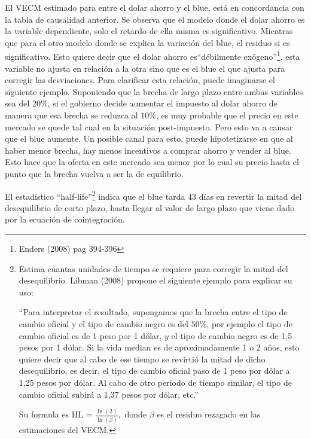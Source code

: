 \documentclass[11pt,a4paper]{article}
\begin{document}
El VECM estimado para entre el dolar ahorro y el blue, está en concordancia con la tabla de causalidad anterior. Se observa que el modelo donde el dolar ahorro es la variable dependiente, solo el retardo de ella misma es significativo. Mientras que para el otro modelo donde se explica la variación del blue, el residuo si es significativo. Esto quiere decir que el dolar ahorro es``débilmente exógeno''\footnote{Enders (2008) pag 394-396}, esta variable no ajusta en relación a la otra sino que es el blue el que ajusta para corregir las desviaciones. Para clarificar esta relación, puede imaginarse el siguiente ejemplo. Suponiendo que la brecha de largo plazo entre ambas variables sea del $20 \% $, si el gobierno decide aumentar el impuesto al dolar ahorro de manera que esa brecha se reduzca al $10 \% $, es muy probable que el precio en este mercado se quede tal cual en la situación post-impuesto. Pero esto va a causar que el blue aumente. Un posible canal para esto, puede hipotetizarse en que al haber menor brecha, hay menos incentivos a comprar ahorro y vender al blue. Esto hace que la oferta en este mercado sea menor por lo cual su precio hasta el punto que la brecha vuelva a ser la de equilibrio. 

El estadístico ``half-life''\footnote{Estima cuantas unidades de tiempo se requiere para corregir la mitad del desequilibrio. Libman (2008) propone el siguiente ejemplo para explicar su uso: 
\begin{center}
``Para interpretar el resultado, supongamos que la brecha entre el tipo de cambio oficial y el tipo de cambio negro es del $50 \%$, por ejemplo el tipo de cambio oficial es de 1 peso por 1 dólar, $y$ el tipo de cambio negro es de 1,5 pesos por 1 dólar. Si la vida median es de aproximadamente 1 o 2 años, esto quiere decir que al cabo de ese tiempo se revirtió la mitad de dicho desequilibrio, es decir, el tipo de cambio oficial paso de 1 peso por dólar a 1,25 pesos por dólar. Al cabo de otro periodo de tiempo similar, el tipo de cambio oficial subirá a 1,37 pesos por dólar, etc.''
\end{center} Su formula es HL = $\frac{\ln (2)}{\ln (\beta)},$ donde $\beta$ es el residuo rezagado en las estimaciones del VECM.} indica que el blue tarda 43 días en revertir la mitad del desequilibrio de corto plazo, hasta llegar al valor de largo plazo que viene dado por la ecuación de cointegración.
\end{document}
